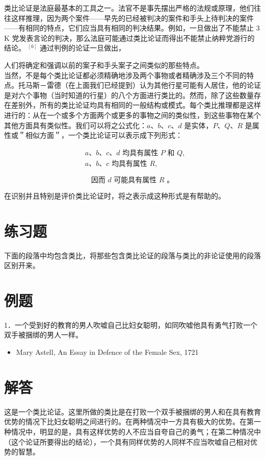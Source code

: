 类比论证是法庭最基本的工具之一。法官不是事先摆出严格的法规或原理，他们往往这样推理，因为两个案件——早先的已经被判决的案件和手头上待判决的案件——有相同的特点，它们应当具有相同的判决结果。例如，一旦做出了不能禁止 3 K 党发表言论的判决，那么法庭可能通过类比论证而得出不能禁止纳粹党游行的结论。 ${ }^{[6]}$ 通过判例的论证一旦做出，

人们将确定和强调以前的案子和手头案子之间类似的那些特点。\\
当然，不是每个类比论证都必须精确地涉及两个事物或者精确涉及三个不同的特点。托马斯－雷德（在上面我们已经提到）认为其他行星可能有人居住，他的论证是对六个事物（当时知道的行星）的八个方面进行类比的。然而，除了这些数量存在差别外，所有的类比论证均具有相同的一般结构或模式。每个类比推理都是这样进行的：从在一个或多个方面两个或更多的事物之间的类似性，到这些事物在某个其他方面具有类似性。我们可以将之公式化：$a 、 b 、 c 、 d$ 是实体，$P 、 Q 、 R$ 是属性或＂相似方面＂，一个类比论证可以表示成下列形式：

$$
\begin{aligned}
& a 、 b 、 c 、 d \text { 均具有属性 } P \text { 和 } Q, \\
& a 、 b 、 c \text { 均具有属性 } R,
\end{aligned}
$$

$$
\text { 因而 } d \text { 可能具有属性 } R \text { 。 }
$$

在识别并且特别是评价类比论证时，将之表示成这种形式是有帮助的。

\section*{练习题}
下面的段落中均包含类比，将那些包含类比论证的段落与类比的非论证使用的段落区别开来。

\section*{例题}
1．一个受到好的教育的男人吹嘘自己比妇女聪明，如同吹嘘他具有勇气打败一个双手被捆绑的男人一样。

\begin{displayquote}

\begin{itemize}
  \item Mary Astell, An Essay in Defence of the Female Sex, 1721
\end{itemize}
\end{displayquote}

\section*{解答}
这是一个类比论证。这里所做的类比是在打败一个双手被捆绑的男人和在具有教育优势的情况下比妇女聪明之间进行的。在两种情况中一方具有极大的优势。在第一种情况中，明显的是，具有这样优势的人不应当自夸自己的勇气；在第二种情况中（这个论证所要得出的结论），一个具有同样优势的人同样不应当吹嘘自己相对优势的智慧。

